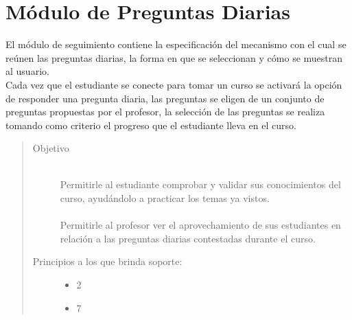 \chapter{Módulo de Preguntas Diarias}
\label{mod:seguimiento}

    El módulo de seguimiento contiene la especificación del mecanismo con el cual se reúnen las preguntas diarias, la forma en que se seleccionan y cómo se muestran al usuario.\\


    \noindent Cada vez que el estudiante se conecte para tomar un curso se activará la opción de responder una pregunta diaria, las preguntas se eligen de un conjunto de preguntas propuestas por el profesor, la selección de las preguntas se realiza tomando como criterio el progreso que el estudiante lleva en el curso.

    \begin{quote}
    \begin{description}
        \item[Objetivo] \hfill\\
            Permitirle al estudiante comprobar y validar sus conocimientos del curso, ayudándolo a practicar los temas ya vistos.\\\\
            Permitirle al profesor ver el aprovechamiento de sus estudiantes en relación a las preguntas diarias contestadas durante el curso.
        \item[Principios a los que brinda soporte:] \hfill
            \begin{itemize}
                \item 2 \principioII
                \item 7 \principioVII
            \end{itemize}
    \end{description}
    \end{quote}
